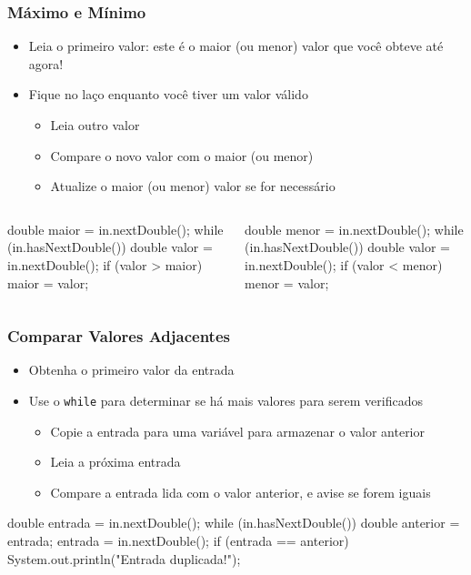 \documentclass[xcolor={dvipsnames,table},aspectratio=169]{beamer}
\begin{document}
\begin{frame}[fragile]\frametitle{Máximo e Mínimo}
\begin{itemize}
	\item Leia o primeiro valor: este é o maior (ou menor) valor que você obteve até agora!
	\item Fique no laço enquanto você tiver um valor válido
	\begin{itemize}
		\item Leia outro valor
		\item Compare o novo valor com o maior (ou menor)
		\item Atualize o maior (ou menor) valor se for necessário
	\end{itemize}
\end{itemize}
\begin{columns}[T]
	\begin{column}{0.5\linewidth}
{\footnotesize
\begin{javacode}
double maior = in.nextDouble();
while (in.hasNextDouble()) {
   double valor = in.nextDouble();
   if (valor > maior) {
      maior = valor;
   }
}
\end{javacode}
}
	\end{column}
	\begin{column}{0.5\linewidth}
{\footnotesize
\begin{javacode}
double menor = in.nextDouble();
while (in.hasNextDouble()) {
   double valor = in.nextDouble();
   if (valor < menor) {
      menor = valor;
   }
}
\end{javacode}
}
	\end{column}
\end{columns}
\end{frame}

\begin{frame}[fragile]\frametitle{Comparar Valores Adjacentes}
\begin{itemize}
	\item Obtenha o primeiro valor da entrada
	\item Use o \texttt{while} para determinar se há mais valores para serem verificados
	\begin{itemize}
		\item Copie a entrada para uma variável para armazenar o valor anterior		
		\item Leia a próxima entrada
		\item Compare a entrada lida com o valor anterior, e avise se forem iguais
	\end{itemize}
\end{itemize}
\begin{javacode}
double entrada = in.nextDouble();
while (in.hasNextDouble()) {
   double anterior = entrada;
   entrada = in.nextDouble();
   if (entrada == anterior) { 
      System.out.println("Entrada duplicada!"); 
   }
}
\end{javacode}
\end{frame}
\end{document}
